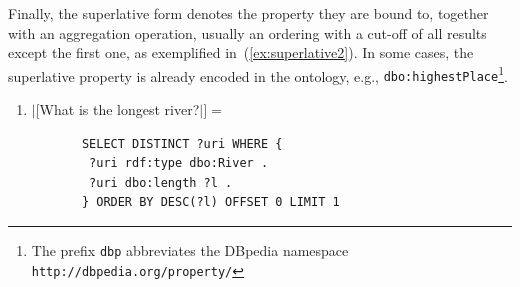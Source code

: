 \documentclass[11pt]{article}
\begin{document}
\vspace{-1.5em}
Finally, the superlative form denotes the property they are bound to, together with an aggregation operation, 
usually an ordering with a cut-off of all results except the first one, as exemplified in~(\ref{ex:superlative2}). 
In some cases, the superlative property is already encoded in the ontology, e.g., {\tt dbo:highestPlace}\footnote{The prefix \texttt{dbp} abbreviates the DBpedia namespace \texttt{http://dbpedia.org/property/}}.
\begin{enumerate}
\item $|[$What is the longest river?$|]=$
       \begin{small}\begin{verbatim}
       SELECT DISTINCT ?uri WHERE { 
        ?uri rdf:type dbo:River . 
        ?uri dbo:length ?l . 
       } ORDER BY DESC(?l) OFFSET 0 LIMIT 1 
       \end{verbatim}\end{small}
\label{ex:superlative2}
\end{enumerate}
\end{document}
